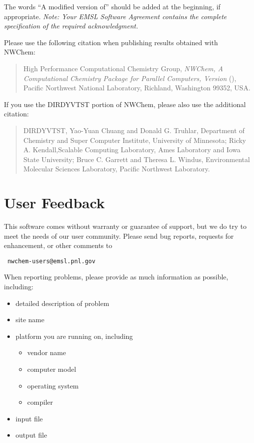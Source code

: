 The words ``A modified version of'' should be added at the beginning,
if appropriate.  {\em Note: Your EMSL Software Agreement contains the
complete specification of the required acknowledgment.}

Please use the following citation when publishing results obtained
with NWChem:
\begin{quote}
  High Performance Computational Chemistry Group, {\em NWChem, A
   Computational Chemistry Package for Parallel Computers, Version
    \nwchemversion{}} (\nwchemyear), Pacific Northwest National
  Laboratory, Richland, Washington 99352, USA.
\end{quote}

If you use the DIRDYVTST portion of NWChem, please also use the additional
citation:
\begin{quote}
  DIRDYVTST, Yao-Yuan Chuang and Donald G. Truhlar,
  Department of Chemistry and Super Computer Institute,
  University of Minnesota; Ricky A. Kendall,Scalable Computing Laboratory,
  Ames Laboratory and Iowa State University; Bruce C. Garrett and Theresa L. 
  Windus, Environmental Molecular Sciences Laboratory, Pacific Northwest 
  Laboratory.
\end{quote}

\section{User Feedback}

This software comes without warranty or guarantee of support,
but we do try to meet the needs of our user community.  Please send bug
reports, requests for enhancement, or other comments to

\begin{verbatim}
 nwchem-users@emsl.pnl.gov
\end{verbatim}

When reporting problems, please provide as much information as possible, 
including:

\begin{itemize}
\item detailed description of problem
\item site name %
\item platform you are running on, including
\begin{itemize}
\item vendor name
\item computer model
\item operating system
\item compiler
\end{itemize}
\item input file
\item output file
\end{itemize}

